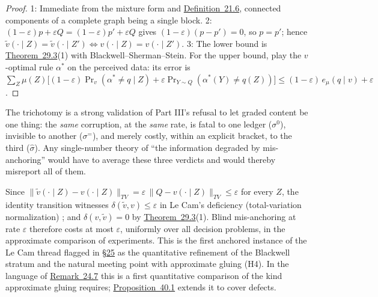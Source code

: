 \begin{proof}

1: Immediate from the mixture form and \hyperlink{stmt:21.6}{Definition~21.6}, connected components of a complete graph being a single block. 2: \((1-\varepsilon)p + \varepsilon Q = (1-\varepsilon)p' + \varepsilon Q\) gives \((1-\varepsilon)(p - p') = 0\), so \(p = p'\); hence \(\tilde v(\cdot \mid Z) = \tilde v(\cdot \mid Z') \iff v(\cdot \mid Z) = v(\cdot \mid Z')\). 3: The lower bound is \hyperlink{stmt:29.3}{Theorem~29.3}(1) with Blackwell--Sherman--Stein. For the upper bound, play the \(v\)-optimal rule \(\alpha^*\) on the perceived data: its error is \(\sum_Z \mu(Z)\big[(1-\varepsilon)\Pr_v(\alpha^* \ne q \mid Z) + \varepsilon \Pr_{Y \sim Q}(\alpha^*(Y) \ne q(Z))\big] \le (1-\varepsilon)\, e_\mu(q \mid v) + \varepsilon\).
\end{proof}

The trichotomy is a strong validation of Part III's refusal to let graded content be one thing: the \emph{same} corruption, at the \emph{same} rate, is fatal to one ledger (\(\sigma^0\)), invisible to another (\(\sigma^=\)), and merely costly, within an explicit bracket, to the third (\(\widehat\sigma\)). Any single-number theory of ``the information degraded by mis-anchoring'' would have to average these three verdicts and would thereby misreport all of them.

\begin{thmrem}

Since \(\|\tilde v(\cdot \mid Z) - v(\cdot \mid Z)\|_{TV} = \varepsilon\, \|Q - v(\cdot \mid Z)\|_{TV} \le \varepsilon\) for every \(Z\), the identity transition witnesses \(\delta(\tilde v, v) \le \varepsilon\) in Le Cam's deficiency (total-variation normalization) \autocite{lecam1964}; and \(\delta(v, \tilde v) = 0\) by \hyperlink{stmt:29.3}{Theorem~29.3}(1). Blind mis-anchoring at rate \(\varepsilon\) therefore costs at most \(\varepsilon\), uniformly over all decision problems, in the approximate comparison of experiments. This is the first anchored instance of the Le Cam thread flagged in \hyperlink{sec:25}{§25} as the quantitative refinement of the Blackwell stratum and the natural meeting point with approximate gluing (H4). In the language of \hyperlink{stmt:24.7}{Remark~24.7} this is a first quantitative comparison of the kind approximate gluing requires; \hyperlink{stmt:40.1}{Proposition~40.1} extends it to cover defects.
\end{thmrem}


